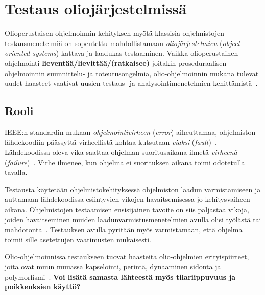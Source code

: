 \documentclass[finnish, grading]{tktltiki2}
\theoremstyle{definition}
\theoremstyle{remark}
\begin{document}


\section{Testaus oliojärjestelmissä}

Olioperustaisen ohjelmoinnin kehityksen myötä klassisia ohjelmistojen testausmenetelmiä on sopeutettu mahdollistamaan \textit{oliojärjestelmien} (\textit{object oriented systems}) kattava ja laadukas testaaminen. Vaikka olioperustainen ohjelmointi \textbf{lieventää/lievittää/(ratkaisee)} joitakin proseduraalisen ohjelmoinnin suunnittelu- ja toteutusongelmia, olio-ohjelmoinnin mukana tulevat uudet haasteet vaativat uusien testaus- ja analysointimenetelmien kehittämistä~\cite[s. 86]{Mariani:Pezze:2008}. 

\subsection{Rooli}

IEEE:n standardin mukaan \textit{ohjelmointivirheen} (\textit{error}) aiheuttamaa, ohjelmiston lähdekoodiin päässyttä virheellistä kohtaa kutsutaan \textit{viaksi} (\textit{fault})~\cite[s. 5]{IEEE:2009}. Lähdekoodissa oleva vika saattaa ohjelman suoritusaikana ilmetä \textit{virheenä} (\textit{failure})~\cite[s. 5]{IEEE:2009}. Virhe ilmenee, kun ohjelma ei suorituksen aikana toimi odotetulla tavalla.

Testausta käytetään ohjelmistokehityksessä ohjelmiston laadun varmistamiseen ja auttamaan lähdekoodissa esiintyvien vikojen havaitsemisessa jo kehitysvaiheen aikana. Ohjelmistojen testaamisen ensisijainen tavoite on siis paljastaa vikoja, joiden havaitseminen muiden laadunvarmistusmenetelmien avulla olisi työlästä tai mahdotonta~\cite[s. 59]{Binder:1999}. Testauksen avulla pyritään myös varmistamaan, että ohjelma toimii sille asetettujen vaatimusten mukaisesti. %

Olio-ohjelmoinnissa testaukseen tuovat haasteita olio-ohjelmien erityispiirteet, joita ovat muun muuassa kapselointi, perintä, dynaaminen sidonta ja polymorfismi~\cite[s. 86]{Mariani:Pezze:2008}. \textbf{Voi lisätä samasta lähteestä myös tilariippuvuus ja poikkeuksien käyttö?}
\end{document}

